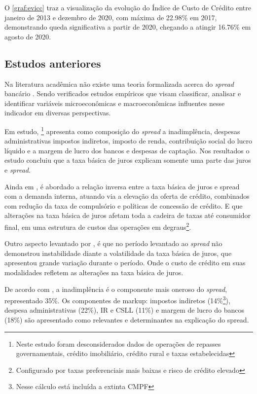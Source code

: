 \documentclass[
  12pt,
  12pt,
  openright,
  oneside,
  a4paper,
  chapter=TITLE,
  section=TITLE,
  subsection=TITLE,
  subsubsection=TITLE,
  english,
  portugues,
  sumario=tradicional]{abntex2}
\begin{document}
O \autoref{graf:evicc} traz a visualização da evolução do Índice de Custo de Crédito entre janeiro de 2013 e dezembro de 2020, com máxima de 22.98\% em 2017, demonstrando queda significativa a partir de 2020, chegando a atingir 16.76\% em agosto de 2020.

\subsection{Estudos anteriores}

Na literatura acadêmica não existe uma teoria formalizada acerca do \emph{spread} bancário \cite{timotio:2018}. Sendo verificados estudos empíricos que visam classificar, analisar e identificar variáveis microeconômicas e macroeconômicas influentes nesse indicador em diversas perspectivas.

Em estudo, \textcite{BCB:1999}\footnote{Neste estudo foram desconsiderados dados de operações de repasses governamentais, crédito imobiliário, crédito rural e taxas estabelecidas} apresenta como composição do \emph{spread} a inadimplência, despesas administrativas impostos indiretos, imposto de renda, contribuição social do lucro líquido e a margem de lucro dos bancos e despesas de captação. Nos resultados o estudo concluiu que a taxa básica de juros explicam somente uma parte das juros e \emph{spread}.

Ainda em \textcite{BCB:1999}, é abordado a relação inversa entre a taxa básica de juros e spread com a demanda interna, atuando via a elevação da oferta de crédito, combinados com redução da taxa de compulsório e políticas de concessão de crédito. E que alterações na taxa básica de juros afetam toda a cadeira de taxas até consumidor final, em uma estrutura de custos das operações em degraus\footnote{Configurado por taxas preferenciais mais baixas e risco de crédito elevado}.

Outro aspecto levantado por \textcite{BCB:1999}, é que no período levantado ao \emph{spread} não demonstrou instabilidade diante a volatilidade da taxa básica de juros, que apresentou grande variação durante o período. Onde o custo de crédito em suas modalidades refletem as alterações na taxa básica de juros.

De acordo com \textcite{BCB:1999}, a inadimplência é o componente mais oneroso do \emph{spread}, representado 35\%. Os componentes de markup: impostos indiretos (14\%\footnote{Nesse cálculo está incluída a extinta CMPF}), despesa administrativas (22\%), IR e CSLL (11\%) e margem de lucro do bancos (18\%) são apresentado como relevantes e determinantes na explicação do spread.
\end{document}
